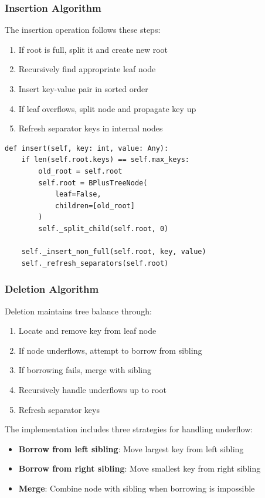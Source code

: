 \documentclass[conference]{IEEEtran}
\begin{document}
\subsubsection{Insertion Algorithm}

The insertion operation follows these steps:

\begin{enumerate}
    \item If root is full, split it and create new root
    \item Recursively find appropriate leaf node
    \item Insert key-value pair in sorted order
    \item If leaf overflows, split node and propagate key up
    \item Refresh separator keys in internal nodes
\end{enumerate}

\begin{lstlisting}[caption=B+ Tree Insertion (Simplified)]
def insert(self, key: int, value: Any):
    if len(self.root.keys) == self.max_keys:
        old_root = self.root
        self.root = BPlusTreeNode(
            leaf=False,
            children=[old_root]
        )
        self._split_child(self.root, 0)

    self._insert_non_full(self.root, key, value)
    self._refresh_separators(self.root)
\end{lstlisting}

\subsubsection{Deletion Algorithm}

Deletion maintains tree balance through:

\begin{enumerate}
    \item Locate and remove key from leaf node
    \item If node underflows, attempt to borrow from sibling
    \item If borrowing fails, merge with sibling
    \item Recursively handle underflows up to root
    \item Refresh separator keys
\end{enumerate}

The implementation includes three strategies for handling underflow:

\begin{itemize}
    \item \textbf{Borrow from left sibling}: Move largest key from left sibling
    \item \textbf{Borrow from right sibling}: Move smallest key from right sibling
    \item \textbf{Merge}: Combine node with sibling when borrowing is impossible
\end{itemize}
\end{document}

